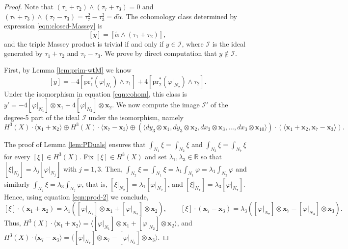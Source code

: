 \documentclass[10pt,a4paper]{amsart}
\newcommand{\R}{\mathbb R}
\newcommand{\la}{\langle}
\newcommand{\ra}{\rangle}
\begin{document}
\begin{proof}
Note that $(\tau_1 + \tau_2)\wedge (\tau_7+ \tau_3) =0$ and $(\tau_7+ \tau_3)\wedge (\tau_7-\tau_3)=\tau_7^2-\tau_3^2=d\widetilde{\alpha}$. The cohomology class determined by expression \eqref{eqn:closed-Massey} is
$$
[y]= [\widetilde{\alpha}\wedge (\tau_1 + \tau_2)],
$$
and the triple Massey product is trivial if and only if $y\in \mathcal{I}$, where
$\mathcal{I}$ is the ideal generated by $\tau_1 + \tau_2$ and $\tau_7-\tau_3$. We prove by direct computation that $y\notin \mathcal{I}$. 

First, by Lemma \ref{lem:prim-wtM} we know
$$
[y]= -4[\mathrm{pr}_1^*(\varphi|_{N_1}) \wedge \tau_1] + 4 [\mathrm{pr}_2^*(\varphi|_{N_2}) \wedge \tau_2].
$$
Under the isomorphism in equation \eqref{eqn:cohom}, this class is $y'=-4[\varphi|_{N_1}] \otimes \mathbf{x}_1 + 4[\varphi|_{N_2}]\otimes \mathbf{x}_2$.
We now compute the image  $\mathcal{I}'$ of the degree-5 part of the ideal $\mathcal{I}$ under the isomorphism,
namely
$$
H^3(X)\cdot \la \mathbf{x}_1+\mathbf{x}_2 \ra \oplus
H^3(X) \cdot \la \mathbf{x}_7-\mathbf{x}_3 \ra
\oplus (\la dy_3 \otimes \mathbf{x}_1, dy_3 \otimes \mathbf{x}_2, dx_3 \otimes \mathbf{x}_3, \dots, dx_3 \otimes \mathbf{x}_{10} \ra)\cdot (\la \mathbf{x}_1+\mathbf{x}_2 ,\mathbf{x}_7-\mathbf{x}_3 \ra) .
$$

The proof of Lemma \ref{lem:PDuals} ensures that 
 $\int_{N_1} \xi= \int_{N_2} \xi$ and  $\int_{N_3} \xi= \int_{N_7} \xi$ for every $[\xi] \in H^3(X)$.
 Fix $[\xi] \in H^3(X)$ and set $\lambda_1,\lambda_3\in \R$ so that $[\xi|_{N_j}]=\lambda_j [\varphi|_{N_j}]$ with $j=1,3$. Then, 
 $\int_{N_2}\xi=\int_{N_1}\xi= \lambda_1 \int_{N_1} \varphi= \lambda_1 \int_{N_2} \varphi$ and similarly $\int_{N_7}\xi= \lambda_3 \int_{N_7} \varphi$, that is, $[\xi|_{N_2}]=\lambda_1 [\varphi|_{N_2}]$, and  $[\xi|_{N_7}]=\lambda_3 [\varphi|_{N_7}]$. Hence, using equation \eqref{eqn:prod-2} we conclude, 
$$
[\xi] \cdot (\mathbf{x}_1+\mathbf{x}_2)= \lambda_1 ([\varphi|_{N_1}]\otimes \mathbf{x}_1+[\varphi|_{N_2}]\otimes \mathbf{x}_2), \qquad 
[\xi] \cdot (\mathbf{x}_7-\mathbf{x}_3)= \lambda_3 ( [\varphi|_{N_7}]\otimes \mathbf{x}_7-[\varphi|_{N_3}]\otimes \mathbf{x}_3).
$$
Thus,
$
H^3(X)\cdot \la \mathbf{x}_1+\mathbf{x}_2 \ra= \la [\varphi|_{N_1}]\otimes \mathbf{x}_1+[\varphi|_{N_2}]\otimes \mathbf{x}_2  \ra$, and  
$H^3(X)\cdot \la \mathbf{x}_7-\mathbf{x}_3 \ra= \la [\varphi|_{N_7}]\otimes \mathbf{x}_7-[\varphi|_{N_3}]\otimes \mathbf{x}_3  \ra .
$


\end{proof}
\end{document}
